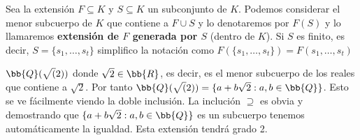\begin{notacion}
    Sea la extensión $F\subseteq K$ y $S\subseteq K$ un subconjunto de $K$. Podemos considerar el menor subcuerpo de $K$ que contiene a $F\cup S$ y lo denotaremos por $F(S)$ y lo llamaremos \textbf{extensión de $F$ generada por $S$} (dentro de $K$). Si $S$ es finito, es decir, $S=\{s_1,\dots,s_t\}$ simplifico la notación como $F(\{s_1,\dots,s_t\}) = F(s_1,\dots,s_t)$
\end{notacion}

\begin{ejemplo}
    $\bb{Q}(\sqrt(2))$ donde $\sqrt{2}\in \bb{R}$, es decir, es el menor subcuerpo de los reales que contiene a $\sqrt{2}$. Por tanto $\bb{Q}(\sqrt(2)) = \{a+b\sqrt{2} : a,b\in \bb{Q}\}$. Esto se ve fácilmente viendo la doble inclusión. La inclución $\supseteq$ es obvia y demostrando que $\{a+b\sqrt{2} : a,b\in \bb{Q}\}$ es un subcuerpo tenemos automáticamente la igualdad. Esta extensión tendrá grado 2.
\end{ejemplo}



